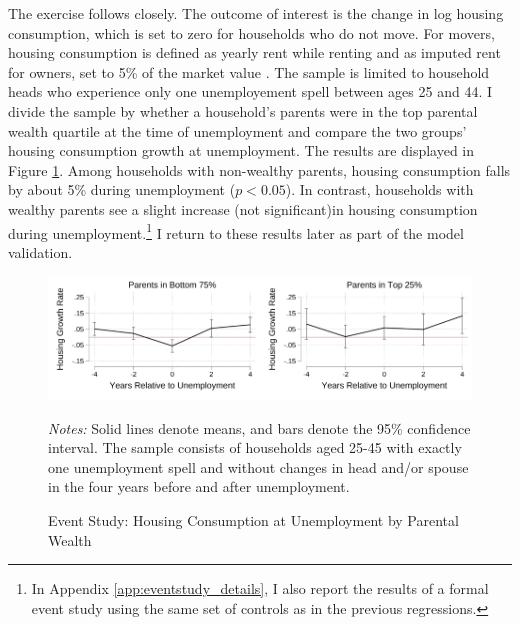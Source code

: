 \documentclass[12pt]{article}
\begin{document}
The exercise follows \cite{Chetty2007} closely. The outcome of interest is the change in log housing consumption, which is set to zero for households who do not move. For movers, housing consumption is defined as yearly rent while renting and as imputed rent for owners, set to 5\% of the market value \citep{Davis2008}. The sample is limited to household heads who experience only one unemployement spell between ages 25 and 44. I divide the sample by whether a household's parents were in the top parental wealth quartile at the time of unemployment and compare the two groups' housing consumption growth at unemployment. The results are displayed in Figure \ref{fig:housinggrowthrates}. Among households with non-wealthy parents, housing consumption falls by about 5\% during unemployment ($p<0.05$). In contrast, households with wealthy parents see a slight increase (not significant)in housing consumption during unemployment.\footnote{In Appendix \ref{app:eventstudy_details}, I also report the results of a formal event study using the same set of controls as in the previous regressions.}  I return to these results later as part of the model validation.

\begin{figure}
	\caption{Event Study: Housing Consumption at Unemployment by Parental Wealth}\label{fig:housinggrowthrates}
	\noindent\includegraphics[width=0.5\textwidth]{../tabfig/descr/PSID_housinggrowthpoor_both}\includegraphics[width=0.5\textwidth]{../tabfig/descr/PSID_housinggrowthrich_both}

	{\begin{footnotesize} \textit{Notes:} Solid lines denote means, and bars denote the 95\% confidence interval. The sample consists of households aged 25-45 with exactly one unemployment spell and without changes in head and/or spouse in the four years before and after unemployment. \end{footnotesize}}
\end{figure}
\end{document}

